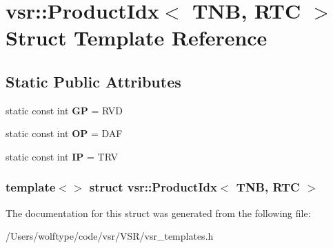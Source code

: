 \hypertarget{structvsr_1_1_product_idx_3_01_t_n_b_00_01_r_t_c_01_4}{\section{vsr\-:\-:Product\-Idx$<$ T\-N\-B, R\-T\-C $>$ Struct Template Reference}
\label{structvsr_1_1_product_idx_3_01_t_n_b_00_01_r_t_c_01_4}
}
\subsection*{Static Public Attributes}
\begin{DoxyCompactItemize}
\item 
\hypertarget{structvsr_1_1_product_idx_3_01_t_n_b_00_01_r_t_c_01_4_a9f36da7cd2ee4ebe16b1249354aee832}{static const int {\bfseries G\-P} = R\-V\-D}\label{structvsr_1_1_product_idx_3_01_t_n_b_00_01_r_t_c_01_4_a9f36da7cd2ee4ebe16b1249354aee832}

\item 
\hypertarget{structvsr_1_1_product_idx_3_01_t_n_b_00_01_r_t_c_01_4_a5321f2aa2ed8e0260bb89595682c2fbc}{static const int {\bfseries O\-P} = D\-A\-F}\label{structvsr_1_1_product_idx_3_01_t_n_b_00_01_r_t_c_01_4_a5321f2aa2ed8e0260bb89595682c2fbc}

\item 
\hypertarget{structvsr_1_1_product_idx_3_01_t_n_b_00_01_r_t_c_01_4_a439fbe7dc31cf4417b3fbbbfbc4c1c5e}{static const int {\bfseries I\-P} = T\-R\-V}\label{structvsr_1_1_product_idx_3_01_t_n_b_00_01_r_t_c_01_4_a439fbe7dc31cf4417b3fbbbfbc4c1c5e}

\end{DoxyCompactItemize}
\subsubsection*{template$<$$>$ struct vsr\-::\-Product\-Idx$<$ T\-N\-B, R\-T\-C $>$}



The documentation for this struct was generated from the following file\-:\begin{DoxyCompactItemize}
\item 
/\-Users/wolftype/code/vsr/\-V\-S\-R/vsr\-\_\-templates.\-h\end{DoxyCompactItemize}
